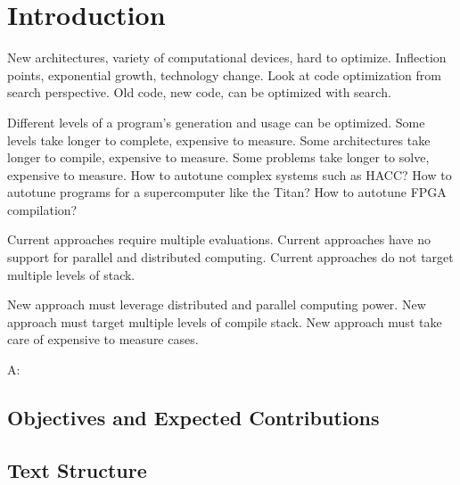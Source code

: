 \chapter{Introduction}
\label{chap:introduction}

New architectures, variety of computational devices, hard to optimize.
Inflection points, exponential growth, technology change.
Look at code optimization from search perspective.
Old code, new code, can be optimized with search.

Different levels of a program's generation and usage can be optimized.
Some levels take longer to complete, expensive to measure.
Some architectures take longer to compile, expensive to measure.
Some problems take longer to solve, expensive to measure.
How to autotune complex systems such as HACC?
How to autotune programs for a supercomputer like the Titan?
How to autotune FPGA compilation?

Current approaches require multiple evaluations.
Current approaches have no support for parallel and distributed computing.
Current approaches do not target multiple levels of stack.

New approach must leverage distributed and parallel computing power.
New approach must target multiple levels of compile stack.
New approach must take care of expensive to measure cases.

A: \citet{bilmes1997optimizing}

\section{Objectives and Expected Contributions}
\label{sec:contributions}

\section{Text Structure}
\label{sec:org}
